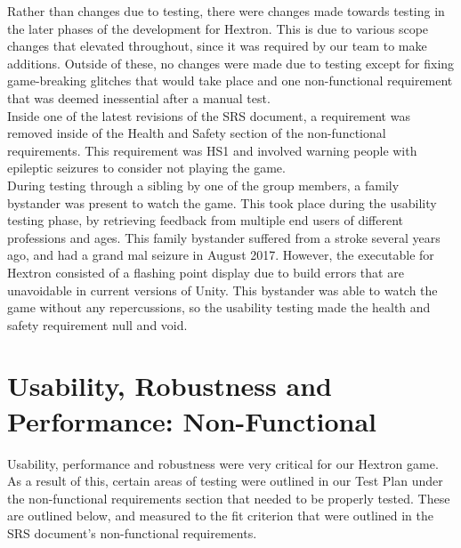 \documentclass[12pt, titlepage]{article}
\begin{document}
    Rather than changes due to testing, there were changes made towards testing in the later phases of the development for Hextron. This is due to various scope changes that elevated throughout, since it was required by our team to make additions. 
    Outside of these, no changes were made due to testing except for fixing game-breaking glitches that would take place and one non-functional requirement that was deemed inessential after a manual test. \\
    
    Inside one of the latest revisions of the SRS document, a requirement was removed inside of the Health and Safety section of the non-functional requirements. This requirement was HS1 and involved warning people with epileptic seizures to consider not playing the game.\\
    
    During testing through a sibling by one of the group members, a family bystander was present to watch the game. This took place during the usability testing phase, by retrieving feedback from multiple end users of different professions and ages. This family bystander suffered from a stroke several years ago, and had a grand mal seizure in August 2017. However, the executable for Hextron consisted of a flashing point display due to build errors that are unavoidable in current versions of Unity. This bystander was able to watch the game without any repercussions, so the usability testing made the health and safety requirement null and void. 

    
    
    
    
    
\section{Usability, Robustness and Performance: Non-Functional}
Usability, performance and robustness were very critical for our Hextron game. As a result of this, certain areas of testing were outlined in our Test Plan under the non-functional requirements section that needed to be properly tested. These are outlined below, and measured to the fit criterion that were outlined in the SRS document's non-functional requirements. \newline \newline
\end{document}
